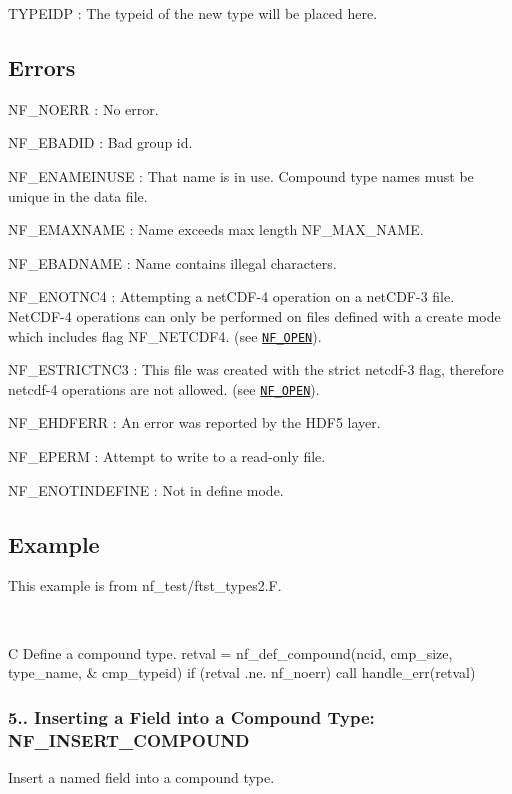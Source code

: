 {\ttfamily T\+Y\+P\+E\+I\+DP} \+: The typeid of the new type will be placed here.

\subsection*{Errors }

{\ttfamily N\+F\+\_\+\+N\+O\+E\+RR} \+: No error.

{\ttfamily N\+F\+\_\+\+E\+B\+A\+D\+ID} \+: Bad group id.

{\ttfamily N\+F\+\_\+\+E\+N\+A\+M\+E\+I\+N\+U\+SE} \+: That name is in use. Compound type names must be unique in the data file.

{\ttfamily N\+F\+\_\+\+E\+M\+A\+X\+N\+A\+ME} \+: Name exceeds max length N\+F\+\_\+\+M\+A\+X\+\_\+\+N\+A\+ME.

{\ttfamily N\+F\+\_\+\+E\+B\+A\+D\+N\+A\+ME} \+: Name contains illegal characters.

{\ttfamily N\+F\+\_\+\+E\+N\+O\+T\+N\+C4} \+: Attempting a net\+C\+D\+F-\/4 operation on a net\+C\+D\+F-\/3 file. Net\+C\+D\+F-\/4 operations can only be performed on files defined with a create mode which includes flag N\+F\+\_\+\+N\+E\+T\+C\+D\+F4. (see \href{#NF_005fOPEN}{\tt N\+F\+\_\+\+O\+P\+EN}).

{\ttfamily N\+F\+\_\+\+E\+S\+T\+R\+I\+C\+T\+N\+C3} \+: This file was created with the strict netcdf-\/3 flag, therefore netcdf-\/4 operations are not allowed. (see \href{#NF_005fOPEN}{\tt N\+F\+\_\+\+O\+P\+EN}).

{\ttfamily N\+F\+\_\+\+E\+H\+D\+F\+E\+RR} \+: An error was reported by the H\+D\+F5 layer.

{\ttfamily N\+F\+\_\+\+E\+P\+E\+RM} \+: Attempt to write to a read-\/only file.

{\ttfamily N\+F\+\_\+\+E\+N\+O\+T\+I\+N\+D\+E\+F\+I\+NE} \+: Not in define mode.

\subsection*{Example }

This example is from nf\+\_\+test/ftst\+\_\+types2.\+F.

 

C Define a compound type. retval = nf\+\_\+def\+\_\+compound(ncid, cmp\+\_\+size, type\+\_\+name, \& cmp\+\_\+typeid) if (retval .ne. nf\+\_\+noerr) call handle\+\_\+err(retval)\hypertarget{nc_f77_interface_guide_f77_NF-INSERT-COMPOUND}{}\subsubsection{5.. Inserting a Field into a Compound Type\+: N\+F\+\_\+\+I\+N\+S\+E\+R\+T\+\_\+\+C\+O\+M\+P\+O\+U\+ND}\label{nc_f77_interface_guide_f77_NF-INSERT-COMPOUND}
Insert a named field into a compound type.

